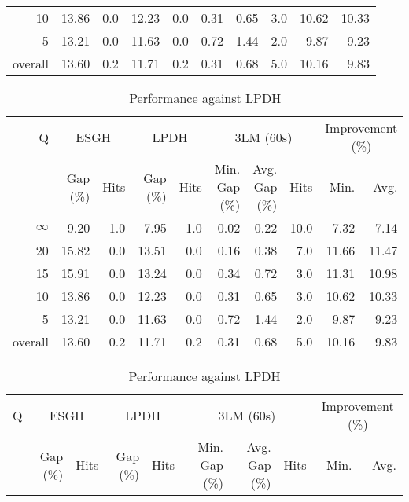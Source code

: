 \begin{table}[H]
\begin{tabular}{r rr rr rrr rr}
      10 &    13.86 &  0.0 &    12.23 &  0.0 &          0.31 &          0.65 &  3.0 &            10.62 & 10.33 \\
       5 &    13.21 &  0.0 &    11.63 &  0.0 &          0.72 &          1.44 &  2.0 &             9.87 &  9.23 \\
\midrule
 overall &    13.60 &  0.2 &    11.71 &  0.2 &          0.31 &          0.68 &  5.0 &            10.16 &  9.83 \\
\bottomrule
\end{tabular}
\end{table}\begin{table}[H]
\centering
\caption{Performance against LPDH}
\label{tab:3lm_resuts_kritikos2}
\begin{tabular}{r rr rr rrr rr}
\toprule
       Q & \multicolumn{2}{c}{ESGH} & \multicolumn{2}{c}{LPDH} & \multicolumn{3}{c}{3LM (60s)} & \multicolumn{2}{c}{Improvement (\%)} \\
         & Gap (\%) & Hits & Gap (\%) & Hits & Min. Gap (\%) & Avg. Gap (\%) & Hits &             Min. &  Avg. \\
\midrule
$\infty$ &     9.20 &  1.0 &     7.95 &  1.0 &          0.02 &          0.22 & 10.0 &             7.32 &  7.14 \\
      20 &    15.82 &  0.0 &    13.51 &  0.0 &          0.16 &          0.38 &  7.0 &            11.66 & 11.47 \\
      15 &    15.91 &  0.0 &    13.24 &  0.0 &          0.34 &          0.72 &  3.0 &            11.31 & 10.98 \\
      10 &    13.86 &  0.0 &    12.23 &  0.0 &          0.31 &          0.65 &  3.0 &            10.62 & 10.33 \\
       5 &    13.21 &  0.0 &    11.63 &  0.0 &          0.72 &          1.44 &  2.0 &             9.87 &  9.23 \\
\midrule
 overall &    13.60 &  0.2 &    11.71 &  0.2 &          0.31 &          0.68 &  5.0 &            10.16 &  9.83 \\
\bottomrule
\end{tabular}
\end{table}\begin{table}[H]
\centering
\caption{Performance against LPDH}
\label{tab:3lm_resuts_kritikos2}
\begin{tabular}{c rr rr rrr rr}
\toprule
       Q & \multicolumn{2}{c}{ESGH} & \multicolumn{2}{c}{LPDH} & \multicolumn{3}{c}{3LM (60s)} & \multicolumn{2}{c}{Improvement (\%)} \\
         & Gap (\%) & Hits & Gap (\%) & Hits & Min. Gap (\%) & Avg. Gap (\%) & Hits &             Min. &  Avg. \\

\end{tabular}
\end{table}
